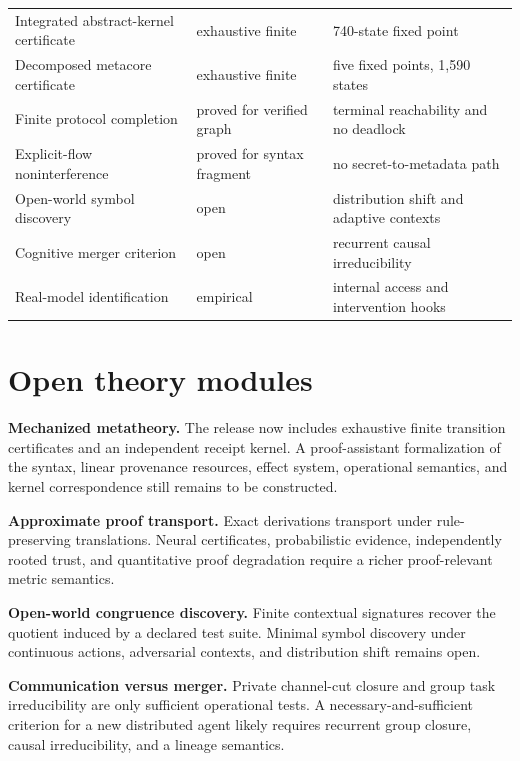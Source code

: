 \documentclass[11pt]{article}
\theoremstyle{definition}
\theoremstyle{remark}
\begin{document}
\begin{longtable}{p{}p{}p{}}
Integrated abstract-kernel certificate & exhaustive finite & 740-state fixed point \\
Decomposed metacore certificate & exhaustive finite & five fixed points, 1,590 states \\
Finite protocol completion & proved for verified graph & terminal reachability and no deadlock \\
Explicit-flow noninterference & proved for syntax fragment & no secret-to-metadata path \\
Open-world symbol discovery & open & distribution shift and adaptive contexts \\
Cognitive merger criterion & open & recurrent causal irreducibility \\
Real-model identification & empirical & internal access and intervention hooks \\
\bottomrule
\end{longtable}

\section{Open theory modules}

\begin{placeholderbox}
\textbf{Mechanized metatheory.} The release now includes exhaustive finite transition certificates and an independent receipt kernel. A proof-assistant formalization of the syntax, linear provenance resources, effect system, operational semantics, and kernel correspondence still remains to be constructed.
\end{placeholderbox}

\begin{placeholderbox}
\textbf{Approximate proof transport.} Exact derivations transport under rule-preserving translations. Neural certificates, probabilistic evidence, independently rooted trust, and quantitative proof degradation require a richer proof-relevant metric semantics.
\end{placeholderbox}

\begin{placeholderbox}
\textbf{Open-world congruence discovery.} Finite contextual signatures recover the quotient induced by a declared test suite. Minimal symbol discovery under continuous actions, adversarial contexts, and distribution shift remains open.
\end{placeholderbox}

\begin{placeholderbox}
\textbf{Communication versus merger.} Private channel-cut closure and group task irreducibility are only sufficient operational tests. A necessary-and-sufficient criterion for a new distributed agent likely requires recurrent group closure, causal irreducibility, and a lineage semantics.
\end{placeholderbox}
\end{document}
